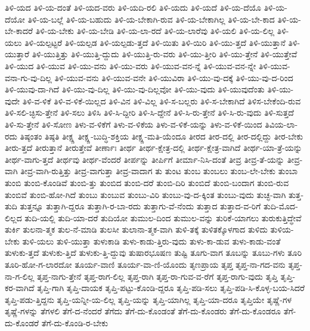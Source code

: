 {ತಿಳಿ-ಯದ
ತಿಳಿ-ಯ-ದಂತೆ
ತಿಳಿ-ಯದ-ವರು
ತಿಳಿ-ಯದಿ-ರಲಿ
ತಿಳಿ-ಯದು
ತಿಳಿ-ಯದೆ
ತಿಳಿ-ಯ-ದೆಯೊ
ತಿಳಿ-ಯ-ದೆಯೋ
ತಿಳಿ-ಯ-ಬಲ್ಲೆ
ತಿಳಿ-ಯ-ಬಹುದು
ತಿಳಿ-ಯ-ಬೇಕಾಗಿ-ರುವ
ತಿಳಿ-ಯ-ಬೇಕಾಗಿಲ್ಲ
ತಿಳಿ-ಯ-ಬೇ-ಕಾದ
ತಿಳಿ-ಯ-ಬೇ-ಕಾದರೆ
ತಿಳಿ-ಯ-ಬೇಕು
ತಿಳಿ-ಯ-ಬೇಡಿ
ತಿಳಿ-ಯ-ಲಾ-ರದೆ
ತಿಳಿ-ಯ-ಲಾರೆವು
ತಿಳಿ-ಯಲಿ
ತಿಳಿ-ಯ-ಲಿಲ್ಲ
ತಿಳಿ-ಯಲು
ತಿಳಿ-ಯಲ್ಪಟ್ಟರೆ
ತಿಳಿ-ಯಲ್ಪಡ
ತಿಳಿ-ಯಲ್ಪಡು-ತ್ತದೆ
ತಿಳಿ-ಯಿತು
ತಿಳಿ-ಯಿರಿ
ತಿಳಿ-ಯು-ತ್ತದೆ
ತಿಳಿ-ಯುತ್ತಾನೆ
ತಿಳಿ-ಯುತ್ತಾರೆ
ತಿಳಿ-ಯುತ್ತಿತ್ತು
ತಿಳಿ-ಯುತ್ತಿ-ದ್ದುದು
ತಿಳಿ-ಯುತ್ತಿ-ರು-ವರು
ತಿಳಿ-ಯು-ತ್ತೀರಿ
ತಿಳಿ-ಯು-ತ್ತೇನೆ
ತಿಳಿ-ಯುತ್ತೇವೆ
ತಿಳಿ-ಯುದ
ತಿಳಿ-ಯುವ
ತಿಳಿ-ಯು-ವನು
ತಿಳಿ-ಯು-ವರು
ತಿಳಿ-ಯುವ-ವನ-ನ್ನೆ
ತಿಳಿ-ಯುವ-ವನ-ನ್ನೇ
ತಿಳಿ-ಯುವ-ವನಾ-ಗು-ವು-ದಿಲ್ಲ
ತಿಳಿ-ಯುವ-ವನು
ತಿಳಿ-ಯುವ-ವನೇ
ತಿಳಿ-ಯುವಿರಾ
ತಿಳಿ-ಯು-ವು-ದಕ್ಕೆ
ತಿಳಿ-ಯು-ವು-ದ-ರಿಂದ
ತಿಳಿ-ಯುವು-ದಾ-ಗಿದೆ
ತಿಳಿ-ಯು-ವು-ದಿಲ್ಲ
ತಿಳಿ-ಯು-ವು-ದಿಲ್ಲವೋ
ತಿಳಿ-ಯು-ವುದು
ತಿಳಿ-ಯುವುದೆಂತು
ತಿಳಿ-ಯು-ವುದೇ
ತಿಳಿ-ವ-ಳಿಕೆ
ತಿಳಿ-ವ-ಳಿಕೆ-ಯಿಲ್ಲದ
ತಿಳಿ-ವಿನ
ತಿಳಿ-ವಿಲ್ಲ
ತಿಳಿ-ಸ-ಬಲ್ಲರು
ತಿಳಿ-ಸ-ಬೇಕಾಗಿದೆ
ತಿಳಿಸ-ಬೇಕೆಂದಿ-ರುವ
ತಿಳಿ-ಸಲಿ-ಚ್ಛಿಸು-ತ್ತೇನೆ
ತಿಳಿ-ಸಲು
ತಿಳಿಸಿ
ತಿಳಿ-ಸಿ-ದ್ದೀರಿ
ತಿಳಿ-ಸಿ-ದ್ದೇನೆ
ತಿಳಿ-ಸಿ-ರು-ತ್ತೇನೆ
ತಿಳಿ-ಸಿ-ರು-ವುದು
ತಿಳಿ-ಸುತ್ತದೆ
ತಿಳಿ-ಸು-ತ್ತೇನೆ
ತಿಳಿ-ಸೋಣ
ತಿಳು-ವ-ಳಿಕೆಗೆ
ತಿಳು-ವ-ಳಿಕೆಯ
ತಿಳು-ವ-ಳಿಕೆ-ಯನ್ನು
ತಿಳು-ವ-ಳಿಕೆ-ಯಿಂದ
ತಿವಿಯ-ಲಾ-ರದು
ತಿಷ್ಠಂತಂ
ತಿಷ್ಠತಿ
ತೀಕ್ಷ್ಣ
ತೀಕ್ಷ್ಣ-ಬುದ್ಧಿ-ಶಕ್ತಿಯ
ತೀಕ್ಷ್ಣ-ಮತಿ-ಯೆಂದೂ
ತೀರದ
ತೀರ-ದಲ್ಲಿ
ತೀರ-ದಲ್ಲಿದ್ದು
ತೀರ-ಬೇಕು
ತೀರು-ತ್ತದೆ
ತೀರುತ್ತಾನೆ
ತೀರುತ್ತೇವೆ
ತೀರ್ಣಾಃ
ತೀರ್ಥ
ತೀರ್ಥ-ಕ್ಷೇತ್ರ-ದಲ್ಲಿ
ತೀರ್ಥ-ಕ್ಷೇತ್ರ-ವಾಗಿದೆ
ತೀರ್ಥ-ಯಾ-ತ್ರೆ-ಯನ್ನು
ತೀರ್ಥ-ವಾಗು-ತ್ತದೆ
ತೀರ್ಥವು
ತೀರ್ಥ-ವೆಂದರೆ
ತೀರ್ಪನ್ನು
ತೀರ್ಪಿಗೆ
ತೀರ್ಮಾ-ನಿಸಿ-ದಂತೆ
ತೀವ್ರ
ತೀವ್ರ-ತೆ-ಯನ್ನು
ತೀವ್ರ-ವಾಗಿ
ತೀವ್ರ-ವಾಗಿ-ರುತ್ತಿತ್ತು
ತೀವ್ರ-ವಾಗುತ್ತಾ
ತೀವ್ರ-ವಾದಾಗ
ತು
ತುಂಟ
ತುಂಬ
ತುಂಬಲು
ತುಂಬ-ಲೇ-ಬೇಕು
ತುಂಬಾ
ತುಂಬಿ
ತುಂಬಿ-ಕೊಂಡಿವೆ
ತುಂಬಿ-ತ್ತು
ತುಂಬಿದ
ತುಂಬಿ-ದರೆ
ತುಂಬಿ-ದಿರಿ
ತುಂಬಿದೆ
ತುಂಬಿ-ಬಂದಾಗ
ತುಂಬಿ-ರುವ
ತುಂಬಿವೆ
ತುಂಬಿ-ಹೋ-ಗಿದೆ
ತುಂಬು
ತುಂಬುವ
ತುಂಬು-ವಿರಿ
ತುಂಬು-ವು-ದ-ಕ್ಕಿಂತ
ತುಂಬು-ವುದು
ತುಚ್ಛ-ವಾಗಿ
ತುತ್ತ-ತುದಿ
ತುತ್ತನ್ನೂ
ತುತ್ತಾಗಿ-ದ್ದರೂ
ತುತ್ತಾಗಿ-ರ-ಬಾ-ರದು
ತುತ್ತಾಗು-ವೆ-ನೆಂದು
ತುತ್ತಾದ
ತುತ್ತಾದ-ವ-ರಿಗೆ
ತುದಿ-ಮೊದ-ಲಿಲ್ಲದ
ತುದಿ-ಯಲ್ಲಿ
ತುದಿ-ಯಾ-ದರೆ
ತುದಿಯೋ
ತುಮುಲ-ದಿಂದ
ತುಮುಲ-ವನ್ನು
ತುರಿಕೆ-ಯಾಗಲು
ತುರುಕುತ್ತಿದ್ಧೇವೆ
ತುರ್ಕಿ
ತುಲನಾ-ತ್ಮಕ
ತುಲ-ನೆ-ಮಾಡಿ
ತುಲಸೀ
ತುಲಾನಾ-ತ್ಮಕ-ವಾಗಿ
ತುಳಿ-ತಕ್ಕೆ
ತುಳಿತಕ್ಕೊಳಗಾದ
ತುಳಿದು
ತುಳಿಯ-ಬೇಕು
ತುಳಿ-ಯಲು
ತುಳಿ-ಯುತ್ತಾ
ತುಳುಕಾಡಿ
ತುಳು-ಕಾಡು-ತ್ತಿರು-ವುದು
ತುಳು-ಕಾ-ಡುವ
ತುಳು-ಕಾಡು-ವಂತೆ
ತುಳುಕು-ತ್ತದೆ
ತುಳುಕು-ತ್ತಿದೆ
ತುಳುಕು-ತ್ತಿ-ದ್ದುವು
ತುಷಾರಭೂಷಣ
ತುಷ್ಟಿ
ತೂಗು-ವಾಗ
ತೂಬನ್ನು
ತೂಬು-ಗಳು
ತೂರಿ
ತೂರಿ-ಹೋ-ಗ-ಲಾರದೋ
ತೂರ್ಯ-ವಾಣಿ
ತೂರ್ಯ-ವಾ-ಣಿ-ಯೊಂದು
ತೃಣಪ್ರಾಯ
ತೃಪ್ತ
ತೃಪ್ತ-ನಾ-ಗದ-ವನು
ತೃಪ್ತ-ನಾ-ಗ-ಲಿಲ್ಲ
ತೃಪ್ತ-ನಾಗು-ತ್ತೇನೆ
ತೃಪ್ತ-ರಾಗ-ಲಿಲ್ಲ
ತೃಪ್ತ-ರಾಗಿ
ತೃಪ್ತ-ರಾ-ಗುವ-ವ-ರೆಗೆ
ತೃಪ್ತ-ರಾಗು-ವುದು
ತೃಪ್ತಿ
ತೃಪ್ತಿ-ಕರ-ವಾಗಿದೆ
ತೃಪ್ತಿ-ಗಾಗಿ
ತೃಪ್ತಿ-ದಾಯಕ
ತೃಪ್ತಿ-ಪಟ್ಟು-ಕೊಂಡಿ-ದ್ದರೂ
ತೃಪ್ತಿ-ಪಡಿ-ಸಲು
ತೃಪ್ತಿ-ಪಡಿ-ಸಿ-ಕೊಳ್ಳ-ಬಯ-ಸಿದರೆ
ತೃಪ್ತಿ-ಪಡು-ತ್ತಿದ್ದನು
ತೃಪ್ತಿ-ಯನ್ನೀ-ಯ-ಲಿಲ್ಲ
ತೃಪ್ತಿ-ಯನ್ನು
ತೃಪ್ತಿ-ಯಾಗಿಲ್ಲ
ತೃಪ್ತಿ-ಯಾ-ದರೂ
ತೃಪ್ತಿಯೇ
ತೃಷ್ಣೆ-ಗಳ
ತೃಷ್ಣೆ-ಗಳನ್ನು
ತೆಗಳಲಿ
ತೆಗೆ-ದ-ನೆಂದರೆ
ತೆಗೆದು
ತೆಗೆ-ದು-ಕೊಂಡಂತೆ
ತೆಗೆ-ದು-ಕೊಂಡರು
ತೆಗೆ-ದು-ಕೊಂಡರೂ
ತೆಗೆ-ದು-ಕೊಂಡರೆ
ತೆಗೆ-ದು-ಕೊಂಡಿ-ರ-ಬೇಕು
}
